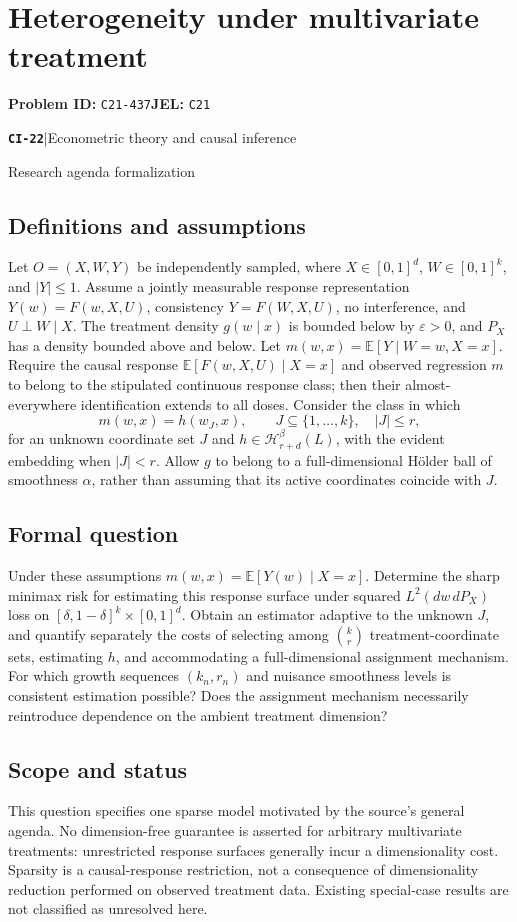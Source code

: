 \documentclass[11pt,a4paper]{article}
\newcommand{\E}{\mathbb E}
\newcommand{\entrymeta}[3]{{\sffamily\small\color{muted}\textbf{\texttt{#1}}\quad|\quad #2\par #3\par}}
\begin{document}
\section*{Heterogeneity under multivariate treatment}
\textbf{Problem ID:} \texttt{C21-437}\quad \textbf{JEL:} \texttt{C21}\par
\label{problem:OP-0501}
\label{beyond:CI-22}
\entrymeta{CI-22}{Econometric theory and causal inference}{Research agenda formalization}
\subsection*{Definitions and assumptions}
Let $O=(X,W,Y)$ be independently sampled, where $X\in[0,1]^d$, $W\in[0,1]^k$, and $|Y|\leq1$. Assume a jointly measurable response representation $Y(w)=F(w,X,U)$, consistency $Y=F(W,X,U)$, no interference, and $U\perp W\mid X$. The treatment density $g(w\mid x)$ is bounded below by $\varepsilon>0$, and $P_X$ has a density bounded above and below. Let $m(w,x)=\E[Y\mid W=w,X=x]$. Require the causal response $\E[F(w,X,U)\mid X=x]$ and observed regression $m$ to belong to the stipulated continuous response class; then their almost-everywhere identification extends to all doses. Consider the class in which
\[
 m(w,x)=h(w_J,x),\qquad J\subseteq\{1,\ldots,k\},\quad |J|\leq r,
\]
for an unknown coordinate set $J$ and $h\in\mathcal H_{r+d}^{\beta}(L)$, with the evident embedding when $|J|<r$. Allow $g$ to belong to a full-dimensional H\"older ball of smoothness $\alpha$, rather than assuming that its active coordinates coincide with $J$.
\subsection*{Formal question}
Under these assumptions $m(w,x)=\E[Y(w)\mid X=x]$. Determine the sharp minimax risk for estimating this response surface under squared $L^2(dw\,dP_X)$ loss on $[\delta,1-\delta]^k\times[0,1]^d$. Obtain an estimator adaptive to the unknown $J$, and quantify separately the costs of selecting among $\binom{k}{r}$ treatment-coordinate sets, estimating $h$, and accommodating a full-dimensional assignment mechanism. For which growth sequences $(k_n,r_n)$ and nuisance smoothness levels is consistent estimation possible? Does the assignment mechanism necessarily reintroduce dependence on the ambient treatment dimension?
\subsection*{Scope and status}
This question specifies one sparse model motivated by the source's general agenda. No dimension-free guarantee is asserted for arbitrary multivariate treatments: unrestricted response surfaces generally incur a dimensionality cost. Sparsity is a causal-response restriction, not a consequence of dimensionality reduction performed on observed treatment data. Existing special-case results are not classified as unresolved here.
\end{document}
